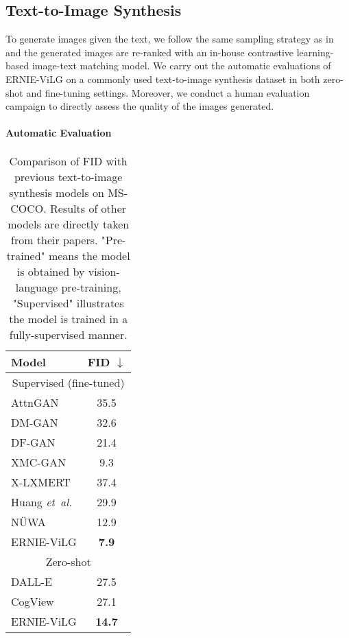 \documentclass{article}
\begin{document}
\subsection{Text-to-Image Synthesis}
To generate images given the text, we follow the same sampling strategy as in \cite{ramesh2021zero} and the generated images are re-ranked with an in-house contrastive learning-based image-text matching model. We carry out the automatic evaluations of ERNIE-ViLG on a commonly used text-to-image synthesis dataset in both zero-shot and fine-tuning settings. Moreover, we conduct a human evaluation campaign to directly assess the quality of the images generated. 
\paragraph{Automatic Evaluation}

\begin{table}[htb]
 \caption{Comparison of FID with previous text-to-image synthesis models on MS-COCO. Results of other models are directly taken from their papers. "Pre-trained" means the model is obtained by vision-language pre-training, "Supervised" illustrates the model is trained in a fully-supervised manner.}
  \centering
  \begin{tabular}{l|c}
    \toprule
    Model & FID $\downarrow$ \\
    \midrule
    \multicolumn{2}{c}{Supervised (fine-tuned)}\\
    \toprule
    AttnGAN \cite{xu2018attngan} & 35.5 \\
    DM-GAN \cite{zhu2019dm} & 32.6 \\
    DF-GAN \cite{tao2020df} & 21.4 \\
    XMC-GAN \cite{zhang2021cross} & 9.3 \\
    X-LXMERT \cite{cho2020x} & 37.4 \\ 
    Huang {\em et\ al.} \cite{huang2021unifying} & 29.9 \\
    NÜWA \cite{wu2021n} & 12.9 \\
    ERNIE-ViLG & \textbf{7.9} \\
    \bottomrule
    \multicolumn{2}{c}{Zero-shot}\\
    \toprule
    DALL-E \cite{ramesh2021zero} & 27.5 \\
    CogView \cite{ding2021cogview} & 27.1 \\
    ERNIE-ViLG & \textbf{14.7} \\
    \bottomrule
  \end{tabular}
  \label{exp-zero-t2i-auto-result}
\end{table}
\end{document}
